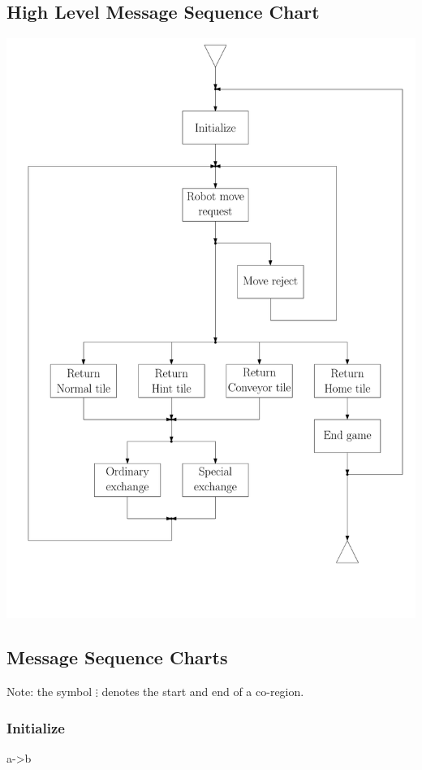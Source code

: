 \subsection{High Level Message Sequence Chart}
	\includegraphics[width=\linewidth,bb=0 0 680 1000]{MSC-files/HMSC.pdf}
	
\subsection{Message Sequence Charts}
	Note: the symbol $\vdots$ denotes the start and end of a co-region.

	\subsubsection{Initialize}
    
    \begin{digraph}
        a->b
    \end{digraph}
    	
